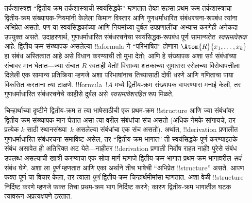 \documentclass[../../../include/open-logic-section]{subfiles}
\begin{document}
तर्कशास्त्रज्ञ “द्वितीय-क्रम तर्कशास्त्राची स्वयंसिद्धके” म्हणतात तेव्हा
सहसा प्रथम-क्रम तर्कशास्त्राचा द्वितीय-क्रम संख्यापक-नियमांनी केलेला किमान
विस्तार आणि गुणधर्माधारित संबंधरचना-रूपबंध त्यांना अभिप्रेत असतो. पण या
स्वयंसिद्धकांच्या आणि नियमांच्या दुर्बल उपप्रणालींचा अभ्यास करणेही अनेकदा
उपयुक्त असते. उदाहरणार्थ, गुणधर्माधारित संबंधरचनेचा स्वयंसिद्धक-रूपबंध पूर्ण
सामान्यतेत \emph{स्वसमावेशक} आहे: द्वितीय-क्रम संख्यापक असलेल्या
!!a{formula} ने “परिभाषित” होणारा $\Atom{R}{x_1, \dots, x_k}$ हा संबंध
अस्तित्वात आहे असे विधान करण्याची तो मुभा देतो; आणि हे संख्यापक अशा सर्व
संबंधांच्या संचावर मान घेतात---ज्या संचात $R$ स्वतःही येतो!{} विसाव्या
शतकाच्या सुमारास रसेलच्या विरोधापत्तीला दिलेली एक सामान्य प्रतिक्रिया म्हणजे
अशा परिभाषांनाच तिच्यासाठी दोषी धरणे आणि गणिताचा पाया विकसित करताना त्या
टाळणे. !!{formula}~$!A$ मध्ये द्वितीय-क्रम संख्यापक वापरण्यास मनाई केली, तर
गुणधर्माधारित संबंधरचनेचे काहीसे दुर्बल असे {\em स्वसमावेशरहित} रूप मिळते.

चिन्हार्थाच्या दृष्टीने द्वितीय-क्रम त त्या भाषेसाठीची एक
प्रथम-क्रम !!{structure} आणि ज्या संबंधांवर द्वितीय-क्रम संख्यापक मान घेतात
असा त्या वरील संबंधांचा संच असतो (अधिक नेमके सांगायचे, तर प्रत्येक
$k$ साठी स्थानसंख्या~$k$ असलेल्या संबंधांचा एक संच असतो). अर्थात,
!!{derivation} प्रणालीत गुणधर्माधारित संबंधरचना समाविष्ट असेल, तर
“द्वितीय-क्रम भागात” ती स्वयंसिद्धके पूर्ण करण्याइतके संबंध असावेत ही
अतिरिक्त अट येते---नाहीतर !!{derivation} प्रणाली निर्दोष राहत नाही!{} पुरेसे
संबंध उपलब्ध असल्याची खात्री करण्याचा एक सोपा मार्ग म्हणजे द्वितीय-क्रम भागात
प्रथम-क्रम भागावरील \emph{सर्व} संबंध घेणे. अशा ला
\emph{पूर्ण} म्हणतात आणि एका अर्थाने तीच भाषेची “अभिप्रेत !!{structure}”
असते. आपण फक्त पूर्ण चा विचार केला, तर त्याला
\emph{पूर्ण} द्वितीय-क्रम चिन्हार्थमीमांसा म्हणतात. अशा वेळी !!{structure}
निर्दिष्ट करणे म्हणजे फक्त तिचा प्रथम-क्रम भाग निर्दिष्ट करणे; कारण
द्वितीय-क्रम भागातील घटक त्यावरून अप्रत्यक्षपणे ठरतात.
\end{document}
